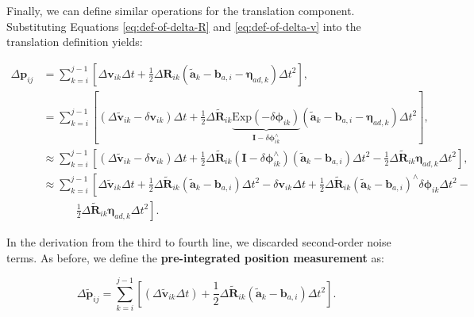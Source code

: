 Finally, we can define similar operations for the translation component. Substituting Equations \eqref{eq:def-of-delta-R} and \eqref{eq:def-of-delta-v} into the translation definition yields:

\begin{equation}
	\begin{aligned}
		\Delta \mathbf{p}_{ij} &= \sum_{k=i}^{j-1} \left[\Delta \mathbf{v}_{ik} \Delta t+\frac{1}{2} \Delta 
		\mathbf{R}_{ik}  \left(\tilde{\mathbf{a}}_k - \mathbf{b}_{a,i} - \boldsymbol{\eta}_{ad, k} \right)\Delta t^2 \right], \\
		&= \sum_{k=i}^{j-1} \left[(\Delta \tilde{\mathbf{v}}_{ik} - \delta \mathbf{v}_{ik}) \Delta t + \frac{1}{2} \Delta 
		\tilde{\mathbf{R}}_{ik} \underbrace{\mathrm{Exp}(-\delta \boldsymbol{\phi}_{ik})}_{\mathbf{I} - \delta 
			\boldsymbol{\phi}_{ik}^\wedge} \left(\tilde{\mathbf{a}}_k - \mathbf{b}_{a,i} - \boldsymbol{\eta}_{ad, k} 
		\right)\Delta t^2 \right], \\
		&\approx \sum_{k=i}^{j-1} \left[ (\Delta \tilde{\mathbf{v}}_{ik} - \delta \mathbf{v}_{ik}) \Delta t +  \frac{1}{2} 
		\Delta \tilde{\mathbf{R}}_{ik} (\mathbf{I} - \delta \boldsymbol{\phi}^\wedge_{ik}) (\tilde{\mathbf{a}}_k - 
		\mathbf{b}_{a,i}) \Delta t^2 - \frac{1}{2}\Delta \tilde{\mathbf{R}}_{ik} \boldsymbol{\eta}_{ad, k} \Delta t^2 
		\right], \\
		&\approx \sum_{k=i}^{j-1} \left[ \Delta \tilde{\mathbf{v}}_{ik} \Delta t + \frac{1}{2}\Delta 
		\tilde{\mathbf{R}}_{ik} (\tilde{\mathbf{a}}_k - \mathbf{b}_{a,i}) \Delta t^2 -\delta \mathbf{v}_{ik} \Delta t + 
		\frac{1}{2}\Delta \tilde{\mathbf{R}}_{ik} (\tilde{\mathbf{a}}_k - \mathbf{b}_{a,i})^\wedge \delta 
		\boldsymbol{\phi}_{ik} \Delta t^2 - \right. \\
		& \quad \quad \quad \left. \frac{1}{2} \Delta \tilde{\mathbf{R}}_{ik} \boldsymbol{\eta}_{ad, k} \Delta t^2  
		\right].
	\end{aligned}
\end{equation}

In the derivation from the third to fourth line, we discarded second-order noise terms. As before, we define the \textbf{pre-integrated position measurement} as:

\begin{equation}
	\Delta \tilde{\mathbf{p}}_{ij} = \sum_{k=i}^{j-1} \left[ (\Delta \tilde{\mathbf{v}}_{ik} \Delta t) + 
	\frac{1}{2}\Delta \tilde{\mathbf{R}}_{ik} (\tilde{\mathbf{a}}_k - \mathbf{b}_{a,i}) \Delta t^2 \right].
\end{equation}

